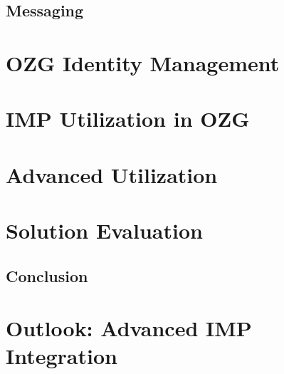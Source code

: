 \documentclass[
     12pt,         %
     a4paper,      %
     BCOR=10mm,version=first,     %
     DIV=14,version=first,        %
     ]{scrreprt}
\begin{document}


\section{Messaging}



\chapter{OZG Identity Management}



\chapter{IMP Utilization in OZG}



\chapter{Advanced Utilization}



\chapter{Solution Evaluation}

\section{Conclusion}

\chapter{Outlook: Advanced IMP Integration}

\printbibliography
\end{document}
